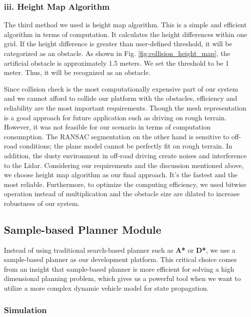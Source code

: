 \documentclass[../thesis.tex]{subfiles}
\begin{document}
\subsubsection{iii. Height Map Algorithm}
The third method we used is height map algorithm. This is a simple and efficient algorithm in terms of computation. It calculates the height differences within one grid. If the height difference is greater than user-defined threshold, it will be categorized as an obstacle. As shown in Fig. \ref{fig:collision_height_map}, the artificial obstacle is approximately 1.5 meters. We set the threshold to be 1 meter. Thus, it will be recognized as an obstacle. 


Since collision check is the most computationally expensive part of our system and we cannot afford to collide our platform with the obstacles, efficiency and reliability are the most important requirements. Though the mesh representation is a good approach for future application such as driving on rough terrain. However, it was not feasible for our scenario in terms of computation consumption. The RANSAC segmentation on the other hand is sensitive to off-road conditions; the plane model cannot be perfectly fit on rough terrain. In addition, the dusty environment in off-road driving create noises and interference to the Lidar. Considering our requirements and the discussion mentioned above, we choose height map algorithm as our final approach. It’s the fastest and the most reliable. Furthermore, to optimize the computing efficiency, we used bitwise operation instead of multiplication and the obstacle size are dilated to increase robustness of our system. 

\subsection{Sample-based Planner Module}

Instead of using traditional search-based planner such as \textbf{A*} or \textbf{D*}, we use a sample-based planner as our development platform. This critical choice comes from an insight that sample-based planner is more efficient for solving a high dimensional planning problem, which gives us a powerful tool when we want to utilize a more complex dynamic vehicle model for state propagation. 

\subsubsection{Simulation}
\end{document}
